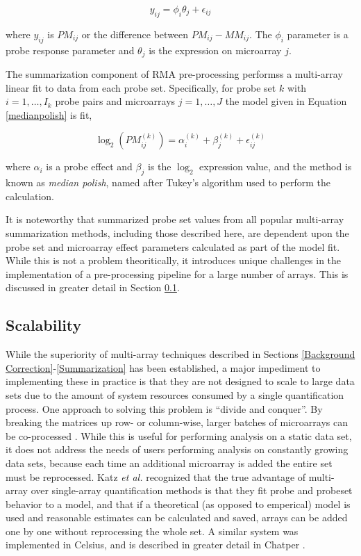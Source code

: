 \begin{equation}
\label{mbeisummary}
y_{ij} = \phi_i \theta_j + \epsilon_{ij}
\end{equation}

where $y_{ij}$ is $PM_{ij}$ or the difference between $PM_{ij}-MM_{ij}$. The
$\phi_i$ parameter is a probe response parameter and $\theta_j$ is the
expression on microarray $j$.

The summarization component of RMA pre-processing \cite{rma} performss a
multi-array linear fit to data from each probe set.  Specifically, for probe
set $k$ with $i=1,\dots,I_k$ probe pairs and microarrays $j=1,\dots,J$ the
model given in Equation \ref{medianpolish} is fit,

\begin{equation}
\label{medianpolish}
\log_2\left(PM^{(k)}_{ij}\right) = \alpha_i^{(k)} + \beta_j^{(k)} + \epsilon_{ij}^{(k)}
\end{equation}

where $\alpha_i$ is a probe effect and $\beta_j$ is the $\log_2$ expression
value, and the method is known as \emph{median polish}, named after Tukey's
algorithm used to perform the calculation.

It is noteworthy that summarized probe set values from all popular multi-array
summarization methods, including those described here, are dependent upon the
probe set and microarray effect parameters calculated as part of the model fit.
While this is not a problem theoritically, it introduces unique challenges in
the implementation of a pre-processing pipeline for a large number of arrays.
This is discussed in greater detail in Section \ref{Scalability}.

\subsection{Scalability}\label{Scalability}

While the superiority of multi-array techniques described in Sections
\ref{Background Correction}-\ref{Summarization} has been established, a major
impediment to implementing these in practice is that they are not designed to
scale to large data sets due to the amount of system resources consumed by a
single quantification process.  One approach to solving this problem is
``divide and conquer''.  By breaking the matrices up row- or column-wise,
larger batches of microarrays can be co-processed \cite{aroma}.  While this is
useful for performing analysis on a static data set, it does not address the
needs of users performing analysis on constantly growing data sets, because
each time an additional microarray is added the entire set must be reprocessed.
Katz \emph{et al.} \cite{genelogic} recognized that the true advantage of
multi-array over single-array quantification methods is that they fit probe and
probeset behavior to a model, and that if a theoretical (as opposed to
emperical) model is used and reasonable estimates can be calculated and saved,
arrays can be added one by one without reprocessing the whole set.  A similar
system was implemented in Celsius, and is described in greater detail in
Chatper \celsiuschapter \cite{celsius}.
